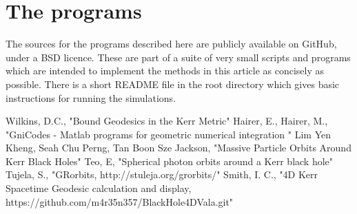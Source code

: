 \documentclass[11pt]{article}
\begin{document}
\section{The programs}

The sources for the programs \cite{m4r35n357} described here are publicly available on GitHub, under a BSD licence.  These are part of a suite of very small scripts and programs which are intended to implement the methods in this article as concisely as possible.  There is a short README file in the root directory which gives basic instructions for running the simulations.

\begin{thebibliography}{1}
 Wilkins, D.C., "Bound Geodesics in the Kerr Metric"
  Hairer, E., Hairer, M., "GniCodes - Matlab programs for geometric numerical integration "
 Lim Yen Kheng, Seah Chu Perng, Tan Boon Sze Jackson, "Massive Particle Orbits Around Kerr Black Holes"
 Teo, E, "Spherical photon orbits around a Kerr black hole"
 Tujela, S., "GRorbits, http://stuleja.org/grorbits/"
 Smith, I. C., "4D Kerr Spacetime Geodesic calculation and display, https://github.com/m4r35n357/BlackHole4DVala.git"
\end{thebibliography}
\end{document}
